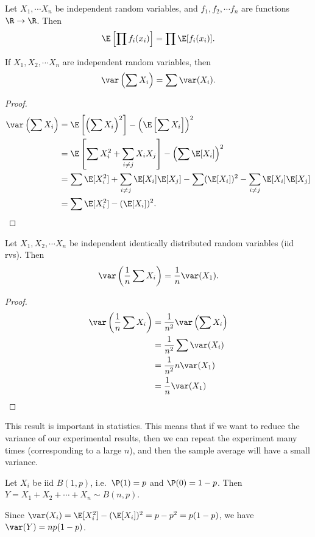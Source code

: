 \documentclass[a4paper]{article}
\begin{document}
\begin{cor}
  Let $X_1,\cdots X_n$ be independent random variables, and $f_1, f_2, \cdots f_n$ are functions $\R\to \R$. Then
  \[
    \E\left[\prod f_i(x_i)\right] = \prod \E[f_i(x_i)].
  \]
\end{cor}

\begin{thm}
  If $X_1, X_2, \cdots X_n$ are independent random variables, then
  \[
    \var\left(\sum X_i\right) = \sum \var (X_i).
  \]
\end{thm}

\begin{proof}
  \begin{align*}
    \var\left(\sum X_i\right) &= \E\left[\left(\sum X_i\right)^2\right] - \left(\E\left[\sum X_i\right]\right)^2\\
    &= \E\left[\sum X_i^2 + \sum_{i \not =j} X_iX_j\right] - \left(\sum\E [X_i]\right)^2\\
    &= \sum \E[X_i^2] + \sum_{i\not= j}\E[X_i]\E[X_j] - \sum(\E[X_i])^2 - \sum_{i\not= j}\E[X_i]\E[X_j]\\
    &= \sum \E[X_i^2] - (\E[X_i])^2.\qedhere
  \end{align*}
\end{proof}

\begin{cor}
 Let $X_1, X_2, \cdots X_n$ be independent identically distributed random variables (iid rvs). Then
 \[
   \var\left(\frac{1}{n}\sum X_i\right) = \frac{1}{n}\var (X_1).
 \]
\end{cor}

\begin{proof}
  \begin{align*}
    \var\left(\frac{1}{n}\sum X_i\right) &= \frac{1}{n^2}\var\left(\sum X_i\right)\\
    &= \frac{1}{n^2}\sum \var(X_i)\\
    &= \frac{1}{n^2} n \var(X_1)\\
    &= \frac{1}{n}\var (X_1)
  \end{align*}
\end{proof}
This result is important in statistics. This means that if we want to reduce the variance of our experimental results, then we can repeat the experiment many times (corresponding to a large $n$), and then the sample average will have a small variance.

\begin{eg}
  Let $X_i$ be iid $B(1, p)$, i.e.\ $\P(1) = p$ and $\P(0) = 1 - p$. Then $Y = X_1 + X_2 + \cdots + X_n \sim B(n, p)$.

  Since $\var(X_i) = \E[X_i^2] - (\E[X_i])^2 = p - p^2 = p(1 - p)$, we have $\var (Y) = np(1 - p)$.
\end{eg}
\end{document}
